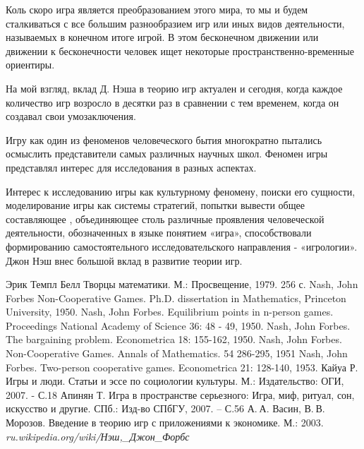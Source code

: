 \documentclass[14pt, a4paper]{extarticle}
\begin{document}
Коль скоро игра является преобразованием этого мира, то мы и будем
сталкиваться с все большим разнообразием игр или иных видов деятельности,
называемых в конечном итоге игрой.
В этом бесконечном движении или движении к бесконечности человек ищет
некоторые пространственно-временные ориентиры.

На мой взгляд, вклад Д. Нэша в теорию игр актуален и сегодня, когда каждое
количество игр возросло в десятки раз в сравнении с тем временем, когда он
создавал свои умозаключения.

Игру как один из феноменов человеческого бытия многократно пытались осмыслить
представители самых различных научных школ.
Феномен игры представлял интерес для исследования в разных аспектах.

Интерес к исследованию игры как культурному феномену, поиски его сущности,
моделирование игры как системы стратегий, попытки вывести общее составляющее
, объединяющее столь различные проявления человеческой деятельности,
обозначенных в языке понятием «игра», способствовали формированию
самостоятельного исследовательского направления - «игрологии».
Джон Нэш внес большой вклад в развитие теории игр. 

\makeatletter
\renewcommand*{\@biblabel}[1]{\hfill#1.}
\makeatother

\begin{thebibliography}{0}
     Эрик Темпл Белл Творцы математики.
        М.: Просвещение, 1979. 256 с. 
     Nash, John Forbes Non-Cooperative Games. Ph.D. dissertation
        in Mathematics, Princeton University, 1950.
     Nash, John Forbes. Equilibrium  points  in  n-person
        games. Proceedings National Academy of Science 36: 48 - 49, 1950.
     Nash, John Forbes. The bargaining problem. Econometrica
        18: 155-162, 1950.
     Nash, John Forbes. Non-Cooperative Games. Annals of
        Mathematics. 54 286-295, 1951
     Nash, John Forbes. Two-person cooperative games.
        Econometrica 21: 128-140, 1953.
     Кайуа Р. Игры и люди.
        Статьи и эссе по социологии культуры.  М.: Издательство: ОГИ, 2007. -
        С.18
     Апинян Т.  Игра в пространстве серьезного: Игра,
        миф, ритуал, сон, искусство и другие. СПб.: Изд-во СПбГУ, 2007. – С.56
     А. А. Васин, В. В.  Морозов. Введение в теорию
        игр с приложениями к экономике. М.: 2003. 
     {\it ru.wikipedia.org/wiki/Нэш,\_Джон\_Форбс}
\end{thebibliography}
\end{document}
